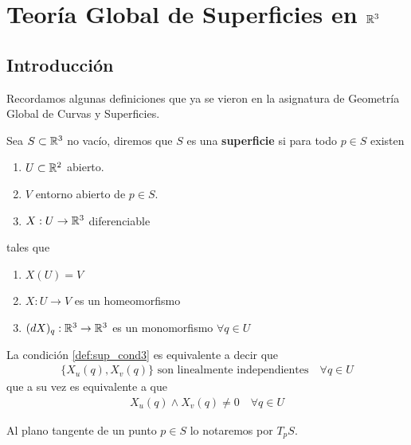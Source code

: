 \chapter{Teoría Global de Superficies en $\mathbb{R}^3$}

\section{Introducción}

Recordamos algunas definiciones que ya se vieron en la asignatura de Geometría Global de Curvas y Superficies.

\begin{definicion}
    Sea $S\subset \mathbb{R}^3$ no vacío, diremos que $S$ es una \textbf{superficie} si para todo $p\in S$ existen
    \begin{enumerate}[label=\alph*)]
        \item \label{def:sup_exists1} $U\subset \mathbb{R}^2$ abierto.
        \item \label{def:sup_exists2} $V$ entorno abierto de $p\in S$.
        \item \label{def:sup_exists3} $X: U \to \mathbb{R}^3$ diferenciable
    \end{enumerate}
    tales que
    \begin{enumerate}[label=\arabic*)]
        \item \label{def:sup_cond1} $X(U)=V$
        \item \label{def:sup_cond2} $X: U \to V$ es un homeomorfismo
        \item \label{def:sup_cond3} $(dX)_q: \mathbb{R}^3\to \mathbb{R}^3$ es un monomorfismo $\forall q\in U$
    \end{enumerate}
\end{definicion}

\begin{observacion}
    La condición \ref{def:sup_cond3} es equivalente a decir que 
    \begin{gather*}
        \{X_u(q), X_v(q)\} \text{ son linealmente independientes} \quad \forall q\in U
    \end{gather*}
    que a su vez es equivalente a que
    \begin{gather*}
        X_u(q) \wedge X_v(q) \neq 0 \quad \forall q \in U
    \end{gather*}
\end{observacion}

\begin{notacion}
    Al plano tangente de un punto $p\in S$ lo notaremos por $T_pS$.
\end{notacion}

